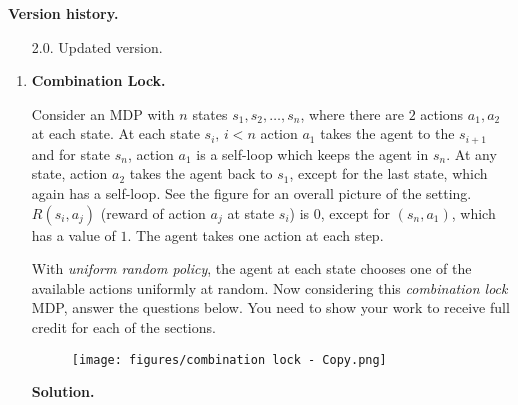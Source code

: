 \documentclass{article}
\theoremstyle{definition}
\theoremstyle{remark}
\newenvironment{Q}
{%
\clearpage
\item
}
{%
\phantom{s}%
\bigskip%
\noindent\textbf{Solution.}
}
\begin{document}
\noindent\textbf{Version history.}
\begin{enumerate}
    \item[2.0.] Updated version.
\end{enumerate}

\begin{enumerate}[font={\Large\bfseries},left=0pt]

\begin{Q}
  \textbf{\Large{}Combination Lock.}

    Consider an MDP with $n$ states $s_1, s_2, \dots, s_n$, where there are $2$ actions $a_1, a_2$ at each state. At each state $s_i,\, i < n$ action $a_1$ takes the agent to the $s_{i+1}$ and for state $s_n$, action $a_1$ is a self-loop which keeps the agent in $s_n$. At any state, action $a_2$ takes the agent back to $s_1$, except for the last state, which again has a self-loop. See the figure for an overall picture of the setting. $R(s_i, a_j)$ (reward of action $a_j$ at state $s_i$) is $0$, except for $(s_n, a_1)$, which has a value of $1$. The agent takes one action at each step. 

    With \textit{uniform random policy}, the agent at each state chooses one of the available actions uniformly at random. Now considering this \textit{combination lock} MDP, answer the questions below. You need to show your work to receive full credit for each of the sections.


\vspace{15pt}

    \begin{figure}[h]
    \texttt{[image: figures/combination lock - Copy.png]}
    \centering
    \end{figure}

\vspace{15pt}


\end{Q}
\end{enumerate}
\end{document}
